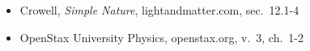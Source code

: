 \begin{itemize}
\item Crowell, \emph{Simple Nature}, lightandmatter.com, sec.~12.1-4
\item OpenStax University Physics, openstax.org, v.~3, ch.~1-2
\end{itemize}
